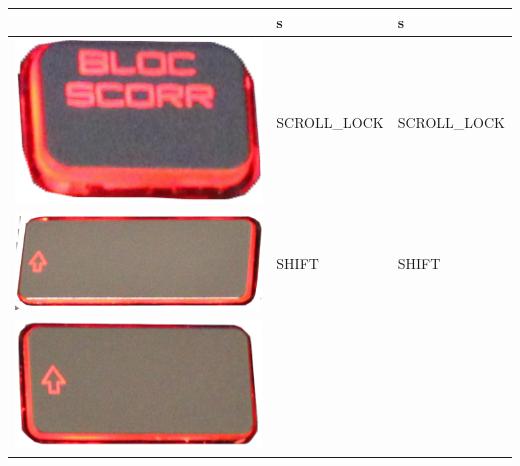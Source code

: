 \begin{longtable}{|cll|}
\begin{minipage}[c]{.4\textwidth}
\vspace{0.2cm}
\end{minipage} & s & s\\
\hline
\begin{minipage}[c]{.4\textwidth}
\vspace{0.2cm}
\includegraphics[scale=0.08]{Images/KeyMapping/SCROLL_LOCK}
\vspace{0.2cm}
\end{minipage} & SCROLL\_LOCK & SCROLL\_LOCK\\
\hline
\begin{minipage}[c]{.4\textwidth}
\vspace{0.2cm}
\includegraphics[scale=0.08]{Images/KeyMapping/SHIFT}
\vspace{0.2cm}
\end{minipage} & SHIFT & SHIFT\\
\hline
\begin{minipage}[c]{.4\textwidth}
\vspace{0.2cm}
\includegraphics[scale=0.08]{Images/KeyMapping/SHIFT_R}

\end{minipage}
\end{longtable}
